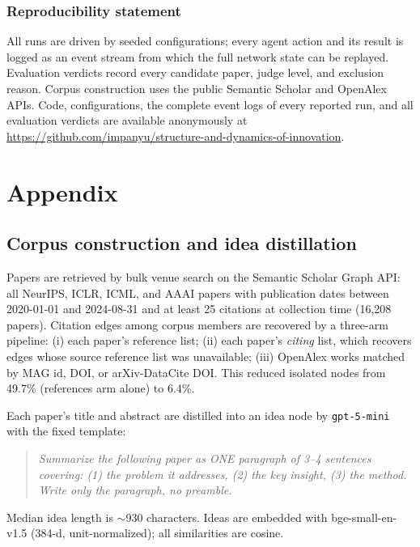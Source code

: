 \documentclass{article} %
\begin{document}
\subsubsection*{Reproducibility statement}
All runs are driven by seeded configurations; every agent action and its
result is logged as an event stream from which the full network state
can be replayed. Evaluation verdicts record every candidate paper,
judge level, and exclusion reason. Corpus construction uses the public
Semantic Scholar and OpenAlex APIs. Code, configurations, the complete
event logs of every reported run, and all evaluation verdicts are
available anonymously at
\url{https://github.com/impanyu/structure-and-dynamics-of-innovation}.




\appendix
\section{Appendix}

\subsection{Corpus construction and idea distillation}
\label{app:corpus}

Papers are retrieved by bulk venue search on the Semantic Scholar Graph
API: all NeurIPS, ICLR, ICML, and AAAI papers with publication dates
between 2020-01-01 and 2024-08-31 and at least 25 citations at
collection time (16{,}208 papers). Citation edges among corpus members
are recovered by a three-arm pipeline: (i) each paper's reference list;
(ii) each paper's \emph{citing} list, which recovers edges whose source
reference list was unavailable; (iii) OpenAlex works matched by MAG id,
DOI, or arXiv-DataCite DOI. This reduced isolated nodes from 49.7\%
(references arm alone) to 6.4\%.

Each paper's title and abstract are distilled into an idea node by
\texttt{gpt-5-mini} with the fixed template:
\begin{quote}\small\itshape
Summarize the following paper as ONE paragraph of 3--4 sentences
covering: (1) the problem it addresses, (2) the key insight, (3) the
method. Write only the paragraph, no preamble.
\end{quote}
Median idea length is $\sim$930 characters. Ideas are embedded with
bge-small-en-v1.5 \citep{xiao2023bge} (384-d, unit-normalized); all
similarities are cosine.
\end{document}
